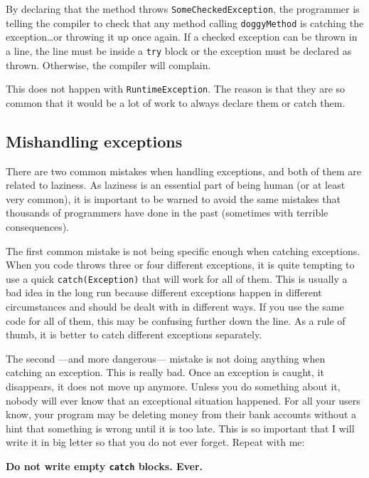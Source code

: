 By declaring that the method throws \verb+SomeCheckedException+, the
programmer is telling the compiler to check that any method calling
\verb+doggyMethod+ is catching the exception\ldots or throwing it up
once again. If a checked exception can be thrown in a line, the line
must be inside a \verb+try+ block or the exception must be declared as
thrown. Otherwise, the compiler will complain. 

This does not happen with \verb+RuntimeException+. The reason is that
they are so common that it would be a lot of work to always declare
them or catch them.


\subsection{Mishandling exceptions}
\label{sec:mish-except}

There are two common mistakes when handling exceptions, and both of
them are related to laziness. As laziness is an essential part of
being human (or at least very common), it is important to be warned to
avoid the same mistakes that thousands of programmers have done in the
past (sometimes with terrible consequences). 

The first common mistake is not being specific enough when catching
exceptions. When you code throws three or four different exceptions,
it is quite tempting to use a quick \verb+catch(Exception)+ that will
work for all of them. This is usually a bad idea in the long run
because different exceptions happen in different circumstances and
should be dealt with in different ways. If you use the same code for
all of them, this may be confusing further down the line. As a rule of
thumb, it is better to catch different exceptions separately. 

The second ---and more dangerous--- mistake is not doing anything when
catching an exception. This is really bad. Once an exception is
caught, it disappears, it does not move up anymore. Unless you do
something about it, nobody will ever know that an exceptional
situation happened. For all your users know, your program may be
deleting money from their bank accounts without a hint that something
is wrong until it is too late. This is so important that I will write
it in big letter so that you do not ever forget. Repeat with me: 

\begin{center}  
{\large \bf Do not write empty \verb+catch+ blocks. Ever. }
\end{center}

